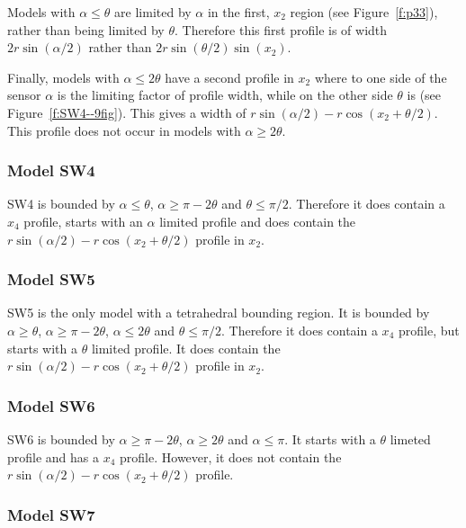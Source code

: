 Models with $\alpha \le \theta$ are limited by $\alpha$ in the first, $x_2$ region (see Figure~\ref{f:p33}), rather than being limited by $\theta$. Therefore this first profile is of width $2r\sin(\alpha/2)$ rather than $2r\sin(\theta/2)\sin(x_2)$.

Finally, models with $\alpha \le 2\theta$ have a second profile in $x_2$ where to one side of the sensor $\alpha$ is the limiting factor of profile width, while on the other side $\theta$ is (see Figure~\ref{f:SW4--9fig}). This gives a width of $r\sin(\alpha/2) - r\cos(x_2 + \theta/2)$. This profile does not occur in models with $\alpha \ge 2\theta$.

\subsubsection{Model SW4} \label{SW4}

SW4 is bounded by $\alpha \le \theta$, $\alpha \ge \pi - 2\theta$ and $\theta \le \pi/2$. Therefore it does contain a $x_4$ profile, starts with an $\alpha$ limited profile and does contain the $r\sin(\alpha/2) - r\cos(x_2 + \theta/2)$ profile in $x_2$.



\subsubsection{Model SW5} \label{SW5}

SW5 is the only model with a tetrahedral bounding region. It is bounded by $\alpha \ge \theta$, $\alpha \ge \pi - 2\theta$, $\alpha \le 2\theta$ and $\theta \le \pi/2$. Therefore it does contain a $x_4$ profile, but starts with a $\theta$ limited profile. It does contain the $r\sin(\alpha/2) - r\cos(x_2 + \theta/2)$ profile in $x_2$.



\subsubsection{Model SW6} \label{SW6}

SW6 is bounded by $\alpha \ge \pi - 2\theta$,  $\alpha \ge 2\theta$ and $\alpha \le \pi$. It starts with a $\theta$ limeted profile and has a $x_4$ profile. However, it does not contain the $r\sin(\alpha/2) - r\cos(x_2 + \theta/2)$ profile.




\subsubsection{Model SW7} \label{SW7}

